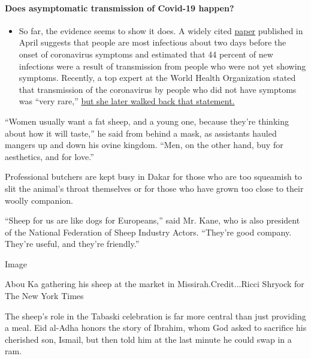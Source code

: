 \begin{itemize}
{  \paragraph{Does asymptomatic transmission of Covid-19
  happen?}\label{does-asymptomatic-transmission-of-covid-19-happen}}

  \begin{itemize}
  \tightlist
  \item
    So far, the evidence seems to show it does. A widely cited
    \href{https://www.nature.com/articles/s41591-020-0869-5}{paper}
    published in April suggests that people are most infectious about
    two days before the onset of coronavirus symptoms and estimated that
    44 percent of new infections were a result of transmission from
    people who were not yet showing symptoms. Recently, a top expert at
    the World Health Organization stated that transmission of the
    coronavirus by people who did not have symptoms was ``very rare,''
    \href{https://www.nytimes3xbfgragh.onion/2020/06/09/world/coronavirus-updates.html?action=click\&pgtype=Article\&state=default\&region=MAIN_CONTENT_3\&context=storylines_faq\#link-1f302e21}{but
    she later walked back that statement.}
  \end{itemize}
\end{itemize}

``Women usually want a fat sheep, and a young one, because they're
thinking about how it will taste,'' he said from behind a mask, as
assistants hauled mangers up and down his ovine kingdom. ``Men, on the
other hand, buy for aesthetics, and for love.''

Professional butchers are kept busy in Dakar for those who are too
squeamish to slit the animal's throat themselves or for those who have
grown too close to their woolly companion.

``Sheep for us are like dogs for Europeans,'' said Mr. Kane, who is also
president of the National Federation of Sheep Industry Actors. ``They're
good company. They're useful, and they're friendly.''

Image

Abou Ka gathering his sheep at the market in Missirah.Credit...Ricci
Shryock for The New York Times

The sheep's role in the Tabaski celebration is far more central than
just providing a meal. Eid al-Adha honors the story of Ibrahim, whom God
asked to sacrifice his cherished son, Ismail, but then told him at the
last minute he could swap in a ram.


